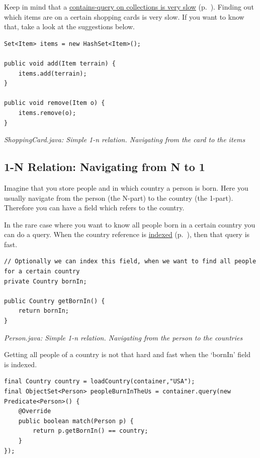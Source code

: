 Keep in mind that a \hyperref[ref:basics-querying-soda-soda-performance-characteristics]{contains-query on collections is very slow} (p.~\pageref{ref:basics-querying-soda-soda-performance-characteristics}). Finding out which items are on a certain shopping cards is very slow. If you want to know that, take a look at the suggestions below.

\begin{lstlisting}
Set<Item> items = new HashSet<Item>();

public void add(Item terrain) {
    items.add(terrain);
}

public void remove(Item o) {
    items.remove(o);
}
\end{lstlisting}

{\small\itshape ShoppingCard.java: Simple 1-n relation. Navigating from the card to the items\par}
\medskip

\subsection{1-N Relation: Navigating from N to 1}
\label{ref:best-practises-managing-relations:nto1-nav}

Imagine that you store people and in which country a person is born. Here you usually navigate from the person (the N-part) to the country (the 1-part). Therefore you can have a field which refers to the country.

In the rare case where you want to know all people born in a certain country you can do a query. When the country reference is \hyperref[ref:basics-indexing]{indexed} (p.~\pageref{ref:basics-indexing}), then that query is fast.

\begin{lstlisting}
// Optionally we can index this field, when we want to find all people for a certain country
private Country bornIn;

public Country getBornIn() {
    return bornIn;
}
\end{lstlisting}

{\small\itshape Person.java: Simple 1-n relation. Navigating from the person to the countries\par}
\medskip

Getting all people of a country is not that hard and fast when the `bornIn' field is indexed.

\begin{lstlisting}
final Country country = loadCountry(container,"USA");
final ObjectSet<Person> peopleBurnInTheUs = container.query(new Predicate<Person>() {
    @Override
    public boolean match(Person p) {
        return p.getBornIn() == country;
    }
});
\end{lstlisting}

